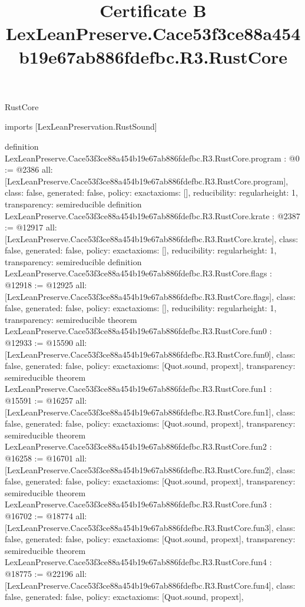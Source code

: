 \begin{lexlean}{RustCore}
\title{Certificate B LexLeanPreserve.Cace53f3ce88a454b19e67ab886fdefbc.R3.RustCore}
\begin{coremodule}
imports [LexLeanPreservation.RustSound]

definition LexLeanPreserve.Cace53f3ce88a454b19e67ab886fdefbc.R3.RustCore.program : @0 := @2386 {
  all: [LexLeanPreserve.Cace53f3ce88a454b19e67ab886fdefbc.R3.RustCore.program],
  class: false,
  generated: false,
  policy: exact{axioms: []},
  reducibility: regular{height: 1},
  transparency: semireducible
}
definition LexLeanPreserve.Cace53f3ce88a454b19e67ab886fdefbc.R3.RustCore.krate : @2387 := @12917 {
  all: [LexLeanPreserve.Cace53f3ce88a454b19e67ab886fdefbc.R3.RustCore.krate],
  class: false,
  generated: false,
  policy: exact{axioms: []},
  reducibility: regular{height: 1},
  transparency: semireducible
}
definition LexLeanPreserve.Cace53f3ce88a454b19e67ab886fdefbc.R3.RustCore.flags : @12918 := @12925 {
  all: [LexLeanPreserve.Cace53f3ce88a454b19e67ab886fdefbc.R3.RustCore.flags],
  class: false,
  generated: false,
  policy: exact{axioms: []},
  reducibility: regular{height: 1},
  transparency: semireducible
}
theorem LexLeanPreserve.Cace53f3ce88a454b19e67ab886fdefbc.R3.RustCore.fun0 : @12933 := @15590 {
  all: [LexLeanPreserve.Cace53f3ce88a454b19e67ab886fdefbc.R3.RustCore.fun0],
  class: false,
  generated: false,
  policy: exact{axioms: [Quot.sound, propext]},
  transparency: semireducible
}
theorem LexLeanPreserve.Cace53f3ce88a454b19e67ab886fdefbc.R3.RustCore.fun1 : @15591 := @16257 {
  all: [LexLeanPreserve.Cace53f3ce88a454b19e67ab886fdefbc.R3.RustCore.fun1],
  class: false,
  generated: false,
  policy: exact{axioms: [Quot.sound, propext]},
  transparency: semireducible
}
theorem LexLeanPreserve.Cace53f3ce88a454b19e67ab886fdefbc.R3.RustCore.fun2 : @16258 := @16701 {
  all: [LexLeanPreserve.Cace53f3ce88a454b19e67ab886fdefbc.R3.RustCore.fun2],
  class: false,
  generated: false,
  policy: exact{axioms: [Quot.sound, propext]},
  transparency: semireducible
}
theorem LexLeanPreserve.Cace53f3ce88a454b19e67ab886fdefbc.R3.RustCore.fun3 : @16702 := @18774 {
  all: [LexLeanPreserve.Cace53f3ce88a454b19e67ab886fdefbc.R3.RustCore.fun3],
  class: false,
  generated: false,
  policy: exact{axioms: [Quot.sound, propext]},
  transparency: semireducible
}
theorem LexLeanPreserve.Cace53f3ce88a454b19e67ab886fdefbc.R3.RustCore.fun4 : @18775 := @22196 {
  all: [LexLeanPreserve.Cace53f3ce88a454b19e67ab886fdefbc.R3.RustCore.fun4],
  class: false,
  generated: false,
  policy: exact{axioms: [Quot.sound, propext]},
}
\end{coremodule}
\end{lexlean}
